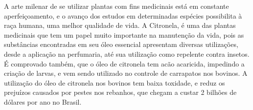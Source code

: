 \documentclass[
	article,			%
	11pt,				%
	oneside,			%
	a4paper,			%
	english,			%
	brazil,				%
	]{abntex2}
\begin{document}
A arte milenar de se utilizar plantas com fins medicinais está em constante aperfeiçoamento, e o avanço dos estudos em determinadas espécies possibilita à raça humana, uma melhor qualidade de vida. A Citronela, é uma das plantas medicinais que tem um papel muito importante na manutenção da vida, pois as substâncias encontradas em seu óleo essencial apresentam diversas utilizações, desde a aplicação na perfumaria, até sua utilização como repelente contra insetos. É comprovado também, que o óleo de citronela tem acão acaricida, impedindo a criação de larvas, e vem sendo utilizado no controle de carrapatos nos bovinos. A utilização do óleo de citronela nos bovinos tem baixa toxidade, e reduz os prejuízos causados por pestes nos rebanhos, que chegam a custar 2 bilhões de dólares por ano no Brasil.




%
%


%
%

%
%
%
\end{document}
